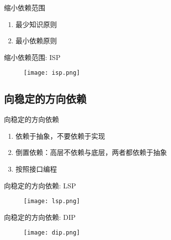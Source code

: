 \begin{frame}[fragile]{缩小依赖范围}
  \begin{enumerate}
    \item \alert{最少知识原则}
    \item \alert{最小依赖原则}
  \end{enumerate}
\end{frame}

\begin{frame}[fragile]{缩小依赖范围: ISP}
  \begin{figure}
    \centering
    \texttt{[image: isp.png]}
  \end{figure}
\end{frame}

\subsection{向稳定的方向依赖}

\begin{frame}[fragile]{向稳定的方向依赖}
  \begin{enumerate}
    \item \alert{依赖于抽象，不要依赖于实现}
    \item \alert{倒置依赖：高层不依赖与底层，两者都依赖于抽象}
    \item \alert{按照接口编程}
  \end{enumerate}
\end{frame}

\begin{frame}[fragile]{向稳定的方向依赖: LSP}
  \begin{figure}
    \centering
    \texttt{[image: lsp.png]}
  \end{figure}
\end{frame}

\begin{frame}[fragile]{向稳定的方向依赖: DIP}
  \begin{figure}
    \centering
    \texttt{[image: dip.png]}
  \end{figure}
\end{frame}
